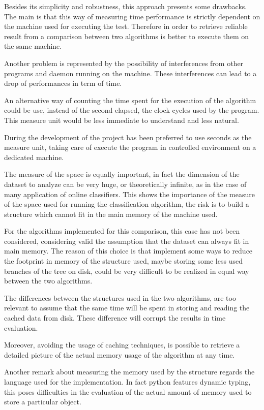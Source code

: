 \documentclass{acm_proc_article-sp-sigmod07}
\begin{document}
Besides its simplicity and robustness, this approach presents some
drawbacks. The main is that this way of measuring time performance is
strictly dependent on the machine used for executing the test.
Therefore in order to retrieve reliable result from a comparison between
two algorithms is better to execute them on the same machine.

Another problem is represented by the possibility of interferences from
other programs and daemon running on the machine. These interferences can
lead to a drop of performances in term of time.

An alternative way of counting the time spent for the execution of the
algorithm could be use, instead of the second elapsed, the clock cycles
used by the program. 
This measure unit would be less immediate to understand and less natural.

During the development of the project has been preferred to use seconds as
the measure unit, taking care of execute the program in controlled
environment on a dedicated machine.

The measure of the space is equally important, in fact the dimension of
the dataset to analyze can be very huge, or theoretically infinite, as in
the case of many application of online classifiers.
This shows the importance of the measure of the space used for running the
classification algorithm, the risk is to build a structure which cannot
fit in the main memory of the machine used.

For the algorithms implemented for this comparison, this case has not been
considered, considering valid the assumption that the dataset can always
fit in main memory.
The reason of this choice is that implement some ways to reduce the
footprint in memory of the structure used, maybe storing some less used
branches of the tree on disk, could be very difficult to be realized in
equal way between the two algorithms.

The differences between the structures used in the two algorithms, are too
relevant to assume that the same time will be spent in storing and reading
the cached data from disk. These difference will corrupt the results in
time evaluation.

Moreover, avoiding the usage of caching techniques, is possible to
retrieve a detailed picture of the actual memory usage of the algorithm at
any time. 

Another remark about measuring the memory used by the structure regards
the language used for the implementation.
In fact python features dynamic typing, this poses difficulties in the
evaluation of the actual amount of memory used to store a
particular object.
\end{document}
